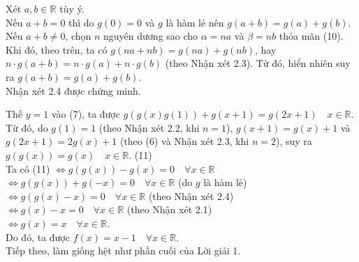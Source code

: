 \begin{bt}
{\begin{itemize}
\begin{cm}
				Xét $a, b \in \mathbb{R}$ tùy ý.\\
				Nếu $a+b=0$ thì do $g(0)=0$ và $g$ là hàm lẻ nên $g(a+b)=g(a)+g(b)$.\\
				Nếu $a+b \ne 0$, chọn $n$ nguyên dương sao cho $\alpha=na$ và $\beta=nb$ thỏa mãn (10). Khi đó, theo trên, ta có
				$g(na+nb)=g(na)+g(nb)$, hay $n \cdot g(a+b)=n \cdot g(a)+n \cdot g(b)$ (theo Nhận xét 2.3). Từ đó, hiển nhiên suy ra $g(a+b)=g(a)+g(b)$.\\
				Nhận xét 2.4 được chứng minh.
			\end{cm}
			Thế $y=1$ vào (7), ta được $g(g(x)g(1))+g(x+1)=g(2x+1) \quad x \in \mathbb{R}$.\\
			Từ đó, do $g(1)=1$ (theo Nhận xét 2.2, khi $n=1$), $g(x+1)=g(x)+1$ và $g(2x+1)=2g(x)+1$ (theo (6) và Nhận xét 2.3, khi $n=2$), suy ra $g(g(x))=g(x) \quad x \in \mathbb{R}.$ \hfill (11)\\
			Ta có (11) $\Leftrightarrow g(g(x))-g(x)=0 \quad \forall x  \in \mathbb{R}$\\
			$\Leftrightarrow g(g(x))+g(-x)=0 \quad \forall x  \in \mathbb{R}$ (do $g$ là hàm lẻ)\\
			$\Leftrightarrow g(g(x)-x)=0 \quad \forall x  \in \mathbb{R}$ (theo Nhận xét 2.4)\\
			$\Leftrightarrow g(x)-x=0 \quad \forall x  \in \mathbb{R}$ (theo Nhận xét 2.1)\\
			$\Leftrightarrow g(x)=x \quad \forall x \in \mathbb{R}$.\\
			Do đó, ta được $f(x)=x-1 \quad \forall x \in \mathbb{R}$.\\
			Tiếp theo, làm giống hệt như phần cuối của Lời giải 1.
		\end{itemize}
	}
\end{bt}
